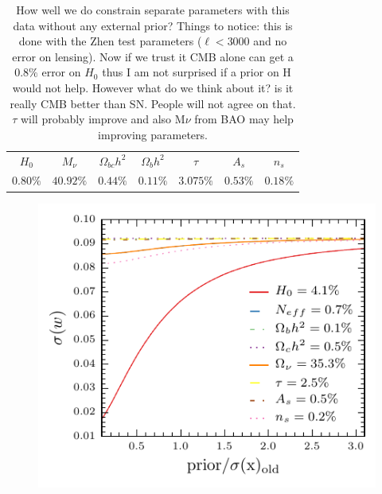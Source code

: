 \documentclass[aps,prd,reprint,superscriptaddress]{revtex4-1}
\begin{document}
\begin{table}[htdp]

\begin{center}
\begin{tabular}{|c|c|c|c|c|c|c|}
\hline
$H_{0}$ &$ M_{\nu}$ &$\Omega_{bc}h^{2}$&$\Omega_{b}h^{2}$&$\tau$&$A_{s}$&$n_{s}$ \\
$0.80 \%$&$40.92\%$&$0.44\%$&$0.11\%$&$3.075\%$&$0.53\%$&$0.18\%$\\

\hline
\end{tabular}
\caption{How well we do constrain separate parameters with this data without any external prior? Things to notice: this is done with the Zhen test parameters ($\ell<3000$ and no error on lensing). Now if we trust it CMB alone can get a $0.8\%$ error on $H_{0}$ thus I am not surprised if a prior on H would not help. However what do we think about it? is it really CMB better than SN. People will not agree on that. $\tau$ will probably improve and also M$\nu$ from BAO may help improving parameters.}
\end{center}
\label{default}
\end{table}%


\begin{figure}[htbp]
\begin{center}
\includegraphics{prior_w_snow_mass.pdf}
\caption{}
\label{fig:prior_w}
\end{center}
\end{figure}
\end{document}
